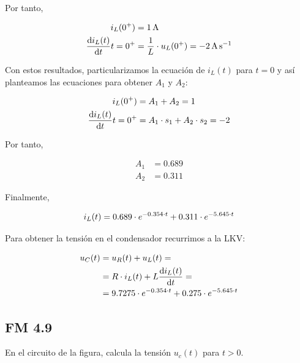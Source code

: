 \documentclass[12pt]{article}
\begin{document}
Por tanto,

\begin{align*}
  i_L(0^+) &= \SI{1}{\ampere}\\
  \diff{i_L(t)}{t}{t = 0^+} &= \frac{1}{L} \cdot u_L(0^+) = \SI{-2}{\ampere\per\second}
\end{align*}

Con estos resultados, particularizamos la ecuación de $i_L(t)$ para $t = 0$ y así planteamos las ecuaciones para obtener $A_1$ y $A_2$:

\begin{align*}
  i_L(0^+) &= A_1 + A_2 = 1\\
  \diff{i_L(t)}{t}{t = 0^+} &= A_1 \cdot s_1 + A_2 \cdot s_2 = -2
\end{align*}

Por tanto,

\begin{align*}
  A_1 &= 0.689\\
  A_2 &= 0.311
\end{align*}

Finalmente,

\begin{equation*}
  i_L(t) = 0.689 \cdot e^{-0.354 \cdot t} + 0.311 \cdot e^{-5.645 \cdot t}\\
\end{equation*}

Para obtener la tensión en el condensador recurrimos a la LKV:

\begin{align*}
  u_C(t) &= u_R(t) + u_L(t) = \\
         &= R \cdot i_L(t) + L \diff{i_L(t)}{t} = \\
  &= 9.7275 \cdot e^{-0.354 \cdot t} + 0.275 \cdot e^{-5.645 \cdot t}
\end{align*}

\clearpage

\subsection{FM 4.9}

En el circuito de la figura, calcula la tensión $u_c(t)$ para $t > 0$.

\vspace*{1cm}
\end{document}
